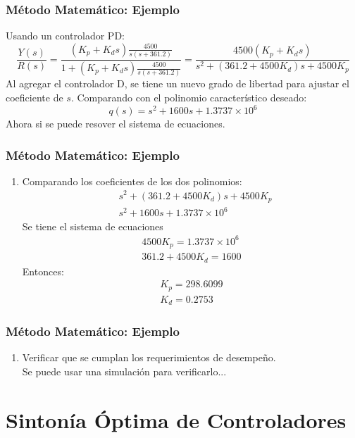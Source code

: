 \documentclass[aspectratio=169,handout]{beamer}
\theoremstyle{definition}
\theoremstyle{plain}
\theoremstyle{remark}
\newcounter{saveenumi}
\newcommand{\seti}{\setcounter{saveenumi}{\value{enumi}}}
\newcommand{\conti}{\setcounter{enumi}{\value{saveenumi}}}
\begin{document}
\begin{frame}[<+->]\frametitle{Método Matemático: Ejemplo}
	Usando un controlador PD:
	\begin{equation*}
		\frac{Y(s)}{R(s)} = \frac{(K_p + K_ds)\frac{4500}{s(s+361.2)}}{1 + (K_p + K_ds)\frac{4500}{s(s+361.2)}} = \frac{4500 (K_p + K_ds)}{s^2 + (361.2+4500K_d)s + 4500K_p}
	\end{equation*}
	Al agregar el controlador D, se tiene un nuevo grado de libertad para ajustar el coeficiente de $s$. Comparando con el polinomio característico deseado:
	\begin{equation*}
		q(s) = s^2 + 1600s + 1.3737\times 10^6
	\end{equation*}
	Ahora si se puede resover el sistema de ecuaciones.
\end{frame}

\begin{frame}[<+->]\frametitle{Método Matemático: Ejemplo}
\begin{enumerate}
	\conti
	\item Comparando los coeficientes de los dos polinomios:
	\begin{align*}
		&s^2 + (361.2+4500K_d)s + 4500K_p\\
		&s^2 + 1600s +1.3737\times 10^6
	\end{align*}
	Se tiene el sistema de ecuaciones
	\begin{align*}
		4500K_p = 1.3737\times 10^6\\
		361.2+4500K_d = 1600
	\end{align*}
	Entonces:
	\begin{align*}
		K_p = 298.6099\\
		K_d = 0.2753
	\end{align*}
	\seti
\end{enumerate}
\end{frame}

\begin{frame}[<+->]\frametitle{Método Matemático: Ejemplo}
	\begin{enumerate}
		\conti
		\item Verificar que se cumplan los requerimientos de desempeño.\\
		\vspace*{5mm}
		Se puede usar una simulación para verificarlo...
	\end{enumerate}
\end{frame}

\section{Sintonía Óptima de Controladores}
\end{document}
